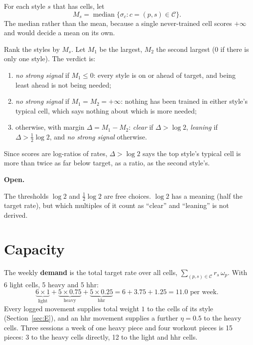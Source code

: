 \documentclass[11pt]{article}
\newenvironment{openitem}{%
  \def\FrameCommand{\fboxsep=8pt{\color{openbar}\vrule width 3pt}\colorbox{openbg}}%
  \MakeFramed{\advance\hsize-\width \FrameRestore}\noindent
  \textbf{Open.}\ %
}{%
  \endMakeFramed\medskip
}
\theoremstyle{plain}
\theoremstyle{definition}
\newcommand{\Cell}{\mathcal{C}}
\newcommand{\light}{\mathrm{light}}
\newcommand{\heavy}{\mathrm{heavy}}
\newcommand{\hhr}{\mathrm{hhr}}
\begin{document}
For each style $s$ that has cells, let
\[
M_s = \operatorname{median}\{ \sigma_c : c = (p, s) \in \Cell \}.
\]
The median rather than the mean, because a single never-trained cell
scores $+\infty$ and would decide a mean on its own.

Rank the styles by $M_s$. Let $M_1$ be the largest, $M_2$ the second
largest ($0$ if there is only one style). The verdict is:

\begin{enumerate}[nosep]
\item \emph{no strong signal} if $M_1 \le 0$: every style is on or
  ahead of target, and being least ahead is not being needed;
\item \emph{no strong signal} if $M_1 = M_2 = +\infty$: nothing has been
  trained in either style's typical cell, which says nothing about which
  is more needed;
\item otherwise, with margin $\Delta = M_1 - M_2$: \emph{clear} if
  $\Delta > \log 2$, \emph{leaning} if $\Delta > \tfrac12 \log 2$, and
  \emph{no strong signal} otherwise.
\end{enumerate}

Since scores are log-ratios of rates, $\Delta > \log 2$ says the top
style's typical cell is more than twice as far below target, as a ratio,
as the second style's.

\begin{openitem}
The thresholds $\log 2$ and $\tfrac12 \log 2$ are free choices. $\log 2$
has a meaning (half the target rate), but which multiples of it count as
``clear'' and ``leaning'' is not derived.
\end{openitem}

\section{Capacity}\label{sec:capacity}

The weekly \textbf{demand} is the total target rate over all cells,
$\sum_{(p,s) \in \Cell} r_s\, \omega_p$. With 6 light cells, 5 heavy and
5 hhr:
\[
\underbrace{6 \times 1}_{\light}
+ \underbrace{5 \times 0.75}_{\heavy}
+ \underbrace{5 \times 0.25}_{\hhr}
= 6 + 3.75 + 1.25 = 11.0 \text{ per week.}
\]
Every logged movement supplies total weight $1$ to the cells of its
style (Section~\ref{sec:E}), and an $\hhr$ movement supplies a further
$\eta = 0.5$ to the heavy cells. Three sessions a week of one heavy piece
and four workout pieces is 15 pieces: 3 to the heavy cells directly, 12
to the light and hhr cells.
\end{document}
